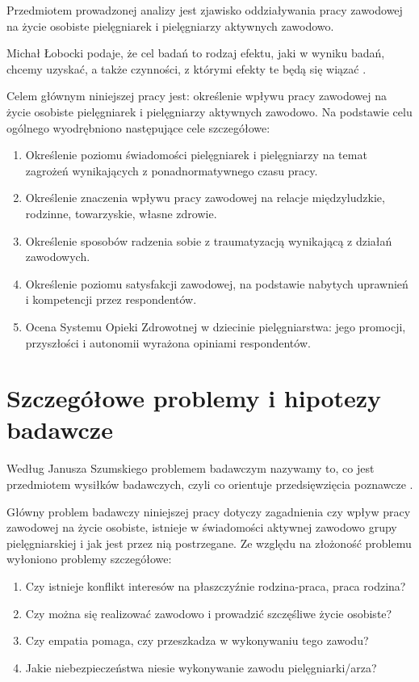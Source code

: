 \documentclass[a4paper,12pt,twoside,openright]{mwrep}
\begin{document}
Przedmiotem prowadzonej analizy jest zjawisko oddziaływania pracy zawodowej na życie osobiste pielęgniarek i pielęgniarzy aktywnych zawodowo.

Michał Łobocki podaje, że cel badań to rodzaj efektu, jaki w wyniku badań, chcemy uzyskać, a także czynności, z którymi efekty te będą się wiązać \cite{mich}.

Celem głównym niniejszej pracy jest: określenie wpływu pracy zawodowej na życie osobiste pielęgniarek i pielęgniarzy aktywnych zawodowo.
Na podstawie celu ogólnego wyodrębniono następujące cele szczegółowe:
\begin{enumerate}
	\item Określenie poziomu świadomości pielęgniarek i pielęgniarzy na temat zagrożeń wynikających z ponadnormatywnego czasu pracy.
	\item Określenie znaczenia wpływu pracy zawodowej na relacje międzyludzkie, rodzinne, towarzyskie, własne zdrowie.
	\item Określenie sposobów radzenia sobie z traumatyzacją wynikającą z działań zawodowych.
	\item Określenie poziomu satysfakcji zawodowej, na podstawie nabytych uprawnień i kompetencji przez respondentów.
	\item Ocena Systemu Opieki Zdrowotnej w dziecinie pielęgniarstwa: jego promocji, przyszłości i autonomii wyrażona opiniami respondentów.
\end{enumerate}

\section{Szczegółowe problemy i hipotezy badawcze}
Według Janusza Szumskiego problemem badawczym nazywamy to, co jest przedmiotem wysiłków badawczych, czyli co orientuje przedsięwzięcia poznawcze \cite{janusz}.

Główny problem badawczy niniejszej pracy dotyczy zagadnienia czy wpływ pracy zawodowej na życie osobiste, istnieje w świadomości aktywnej zawodowo grupy pielęgniarskiej i jak jest przez nią postrzegane. Ze względu na złożoność problemu wyłoniono problemy szczegółowe:
\begin{enumerate}
	\item Czy istnieje konflikt interesów na płaszczyźnie rodzina-praca, praca rodzina?
	\item Czy można się realizować zawodowo i prowadzić szczęśliwe życie osobiste?
	\item Czy empatia pomaga, czy przeszkadza w wykonywaniu tego zawodu?
	\item Jakie niebezpieczeństwa niesie wykonywanie zawodu pielęgniarki/arza?
\end{enumerate}
\end{document}
